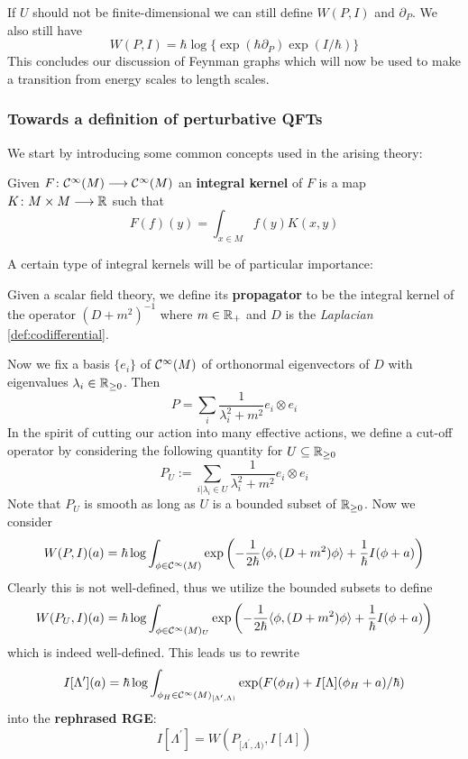 If $U$ should not be finite-dimensional we can still define $W(P,I)$ and $\partial_P$. We also still have
$$ W(P,I) = \hbar \log\{ \exp(\hbar \partial_P) \exp(I/\hbar) \} $$
This concludes our discussion of Feynman graphs which will now be used to make a transition from energy scales to length scales.

\subsubsection{Towards a definition of perturbative QFTs}

We start by introducing some common concepts used in the arising theory:

\begin{definition}
  Given $F\colon \mathcal{C}^{\infty}(M) \longrightarrow \mathcal{C}^{\infty}(M)$ an \textbf{integral kernel} of $F$ is a map $K \colon M \times M \longrightarrow \mathbb{R}$ such that
  $$ F(f)(y) = \int_{x \in M} f(y) K(x,y) $$
\end{definition}

A certain type of integral kernels will be of particular importance:

\begin{definition}[Propagators]
  Given a scalar field theory, we define its \textbf{propagator} to be the integral kernel of the operator $(D+m^2)^{-1}$ where $m \in \mathbb{R}_+$ and $D$ is the \emph{Laplacian} \ref{def:codifferential}.
\end{definition}

Now we fix a basis $\{e_i\}$ of $\mathcal{C}^{\infty}(M)$ of orthonormal eigenvectors of $D$ with eigenvalues $\lambda_i \in \mathbb{R}_{\geq 0}$. Then
$$ P = \sum_i \frac{1}{\lambda_i^2 + m^2} e_i \otimes e_i $$
In the spirit of cutting our action into many effective actions, we define a cut-off operator by considering the following quantity for $U \subseteq \mathbb{R}_{\geq 0}$
$$ P_U := \sum_{i|\lambda_i \in U} \frac{1}{\lambda_i^2 + m^2} e_i \otimes e_i $$
Note that $P_U$ is smooth as long as $U$ is a bounded subset of $\mathbb{R}_{\geq 0}$. Now we consider
$$ W(P,I)(a) = \hbar \log \int_{\phi \in \Ci(M)} \exp\left( - \frac{1}{2\hbar} \langle \phi, (D+m^2) \phi \rangle + \frac{1}{\hbar} I(\phi +a) \right) $$
Clearly this is not well-defined, thus we utilize the bounded subsets to define
$$ W(P_U,I)(a) = \hbar \log \int_{\phi \in \Ci(M)_U} \exp\left( - \frac{1}{2\hbar} \langle \phi, (D+m^2) \phi \rangle + \frac{1}{\hbar} I(\phi +a) \right) $$
which is indeed well-defined. This leads us to rewrite
$$ I[\Lambda^\prime](a) = \hbar \log \int_{\phi_H \in \Ci(M)_{[\Lambda^\prime, \Lambda)}} \exp(F(\phi_H) + I[\Lambda](\phi_H + a)/\hbar) $$
into the \textbf{rephrased RGE}:
\begin{equation}
\label{eq:RGE_2}\tag{RGE}
I[\Lambda^\prime] = W \left( P_{[\Lambda^\prime, \Lambda)}, I[\Lambda] \right)
\end{equation}

